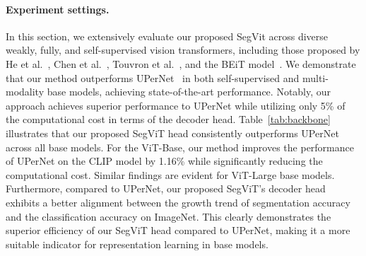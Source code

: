 \paragraph{Experiment settings.} 
In this section, we extensively evaluate our proposed SegVit across diverse weakly, fully, and self-supervised vision transformers, 
including those proposed by He et al.~\cite{he2022masked}, Chen et al.~\cite{chen2022context}, Touvron et al.~\cite{touvron2022deit}, and the BEiT model~\cite{beitv2}. We demonstrate that our method outperforms UPerNet~\cite{Upernet} in both self-supervised and multi-modality base models, achieving state-of-the-art performance. Notably, our approach achieves superior performance to UPerNet while utilizing only 5\% of the computational cost in terms of the decoder head.
Table~\ref{tab:backbone} illustrates that our proposed SegViT head consistently outperforms UPerNet across all base models. For the ViT-Base, our method improves the performance of UPerNet on the CLIP model by 1.16\% while significantly reducing the computational cost. Similar findings are evident for ViT-Large base models. Furthermore, compared to UPerNet, our proposed SegViT's decoder head exhibits a better alignment between the growth trend of segmentation accuracy and the classification accuracy on ImageNet. This clearly demonstrates the superior efficiency of our SegViT head compared to UPerNet, making it a more suitable indicator for representation learning in base models.




\newcommand{\trian}{\begin{small}\color{Black}\end{small}}



